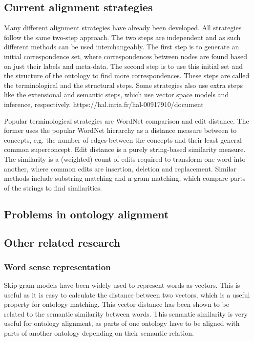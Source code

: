 \documentclass{article}
\begin{document}
 \subsection{Current alignment strategies}
 Many different alignment strategies have already been developed. All strategies follow the same two-step approach. The two steps are independent and as such different methods can be used interchangeably. The first step is to generate an initial correspondence set, where correspondences between nodes are found based on just their labels and meta-data. The second step is to use this initial set and the structure of the ontology to find more correspondences. These steps are called the terminological and the structural steps. Some strategies also use extra steps like the extensional and semantic steps, which use vector space models and inference, respectively. https://hal.inria.fr/hal-00917910/document
 
 Popular terminological strategies are WordNet comparison and edit distance. The former uses the popular WordNet hierarchy as a distance measure between to concepts, e.g. the number of edges between the concepts and their least general common superconcept. %
 Edit distance is a purely string-based similarity measure. The similarity is a (weighted) count of edits required to transform one word into another, where common edits are insertion, deletion and replacement. Similar methods include substring matching and n-gram matching, which compare parts of the strings to find similarities. %
 \subsection{Problems in ontology alignment}
 \subsection{Other related research}
 \subsubsection{Word sense representation}
 Skip-gram models have been widely used to represent words as vectors. This is useful as it is easy to calculate the distance between two vectors, which is a useful property for ontology matching. This vector distance has been shown to be related to the semantic similarity between words. This semantic similarity is very useful for ontology alignment, as parts of one ontology have to be aligned with parts of another ontology depending on their semantic relation.
 
\end{document}
